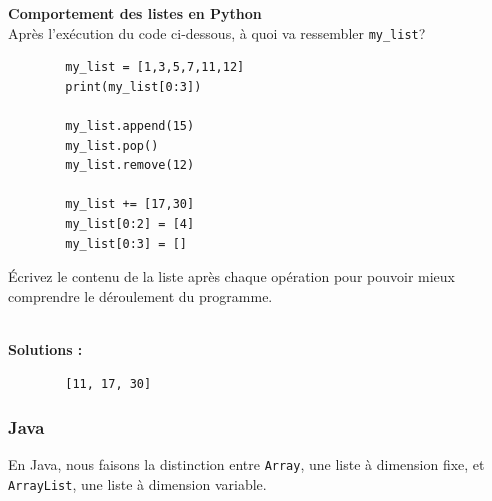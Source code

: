 \begin{Exercice}[5 minutes] \textbf{Comportement des listes en Python} \\
    Après l'exécution du code ci-dessous, à quoi va ressembler \lstinline{my_list}?
    
    \begin{verbatim}
        my_list = [1,3,5,7,11,12]
        print(my_list[0:3])
        
        my_list.append(15)
        my_list.pop()
        my_list.remove(12)
        
        my_list += [17,30]
        my_list[0:2] = [4]
        my_list[0:3] = []
    \end{verbatim}
    
    \begin{conseil}
        Écrivez le contenu de la liste après chaque opération pour pouvoir mieux comprendre le déroulement du programme.
    \end{conseil}
    \ \\
    \textbf{Solutions :}
    \begin{verbatim}
        [11, 17, 30]
    \end{verbatim}
    
\end{Exercice}

\subsubsection{Java}

En Java, nous faisons la distinction entre \lstinline{Array}, une liste à dimension fixe, et \lstinline{ArrayList}, une liste à dimension variable.

